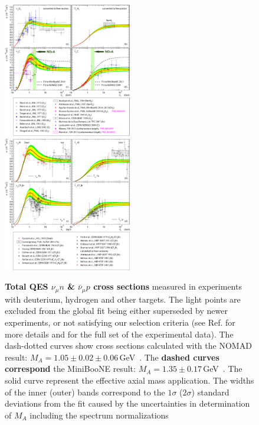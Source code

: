 \begin{figure}[htb!]
\includegraphics[width=0.5\textwidth]{./QES/sQESCC_101.2.31.301.1b_2_BBBA25_NT_1_NOvA.eps}
\includegraphics[width=0.5\textwidth]{./QES/sQESCC_101.2.31.301.1b_2_BBBA25_NT_2.eps}
\caption{\label{TotalCS}\textbf{Total QES $\nu_{\mu}n$ \& $\bar\nu_{\mu}p$ cross sections} measured in experiments with deuterium, hydrogen and other targets. The light points are excluded from the global fit being either superseded by newer experiments, or not satisfying our selection criteria (see Ref.\cite{Kuzmin:2007kr} for more details and for the full set of the experimental data). The dash-dotted curves show cross sections calculated with the NOMAD result: $M_A=1.05\pm0.02\pm0.06$\,GeV~\cite{Lyubushkin:2008pe}. The \textbf{dashed curves correspond} the MiniBooNE result: $M_{A}=1.35\pm0.17$\,GeV~\cite{AguilarArevalo:2010zc}. The solid curve represent the effective axial mass application. The widths of the inner (outer) bands correspond to the $1\sigma$ ($2\sigma$) standard deviations from the fit caused by the uncertainties in determination of $M_{A}$ including the spectrum normalizations}
\end{figure}


